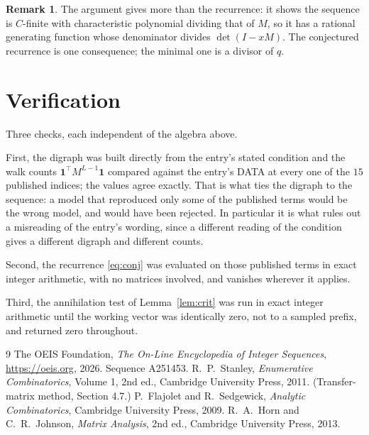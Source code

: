 \documentclass[11pt,a4paper]{article}
\theoremstyle{plain}
\theoremstyle{definition}
\newtheorem{remark}[theorem]{Remark}
\begin{document}
\begin{remark}
The argument gives more than the recurrence: it shows the sequence is $C$-finite with
characteristic polynomial dividing that of $M$, so it has a rational generating function
whose denominator divides $\det(I-xM)$. The conjectured recurrence is one consequence; the
minimal one is a divisor of $q$.
\end{remark}

\section{Verification}

Three checks, each independent of the algebra above.

First, the digraph was built directly from the entry's stated condition and the walk counts
$\mathbf{1}^{\!\top}M^{L-1}\mathbf{1}$ compared against the entry's DATA at
every one of the $15$ published indices; the values agree exactly. That is what ties
the digraph to the sequence: a model that reproduced only some of the published terms would
be the wrong model, and would have been rejected. In particular it is what rules out a
misreading of the entry's wording, since a different reading of the condition gives a
different digraph and different counts.

Second, the recurrence \eqref{eq:conj} was evaluated on those published terms in exact
integer arithmetic, with no matrices involved, and vanishes wherever it applies.

Third, the annihilation test of Lemma~\ref{lem:crit} was run in exact integer arithmetic
until the working vector was identically zero, not to a sampled prefix, and returned zero
throughout.

\begin{thebibliography}{9}
 The OEIS Foundation, \emph{The On-Line Encyclopedia of Integer
Sequences}, \url{https://oeis.org}, 2026. Sequence A251453.
 R.~P.~Stanley, \emph{Enumerative Combinatorics}, Volume 1, 2nd ed.,
Cambridge University Press, 2011. (Transfer-matrix method, Section 4.7.)
 P.~Flajolet and R.~Sedgewick, \emph{Analytic Combinatorics}, Cambridge
University Press, 2009.
 R.~A.~Horn and C.~R.~Johnson, \emph{Matrix Analysis}, 2nd ed., Cambridge
University Press, 2013.
\end{thebibliography}
\end{document}
